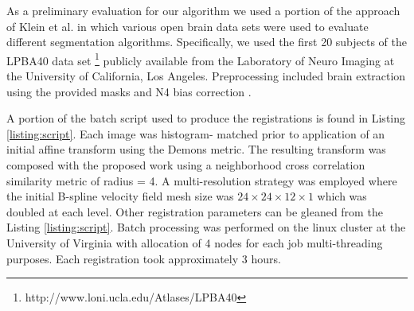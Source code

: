 \documentclass{llncs}
\begin{document}
As a preliminary evaluation for our algorithm we used a portion 
of the approach of Klein et al. \cite{Klein2009} in which 
various open brain data sets were used to evaluate different
segmentation algorithms.  Specifically, we used the first 20 
subjects of the LPBA40 data
set \cite{shattuck2008}%
\footnote{
http://www.loni.ucla.edu/Atlases/LPBA40
}
publicly available from the Laboratory of Neuro Imaging at
the University of California, Los Angeles.  Preprocessing included
brain extraction using the provided masks and N4 bias correction
\cite{tustison2010}.  


A portion of the batch script used to produce the registrations is 
found in Listing \ref{listing:script}.  Each image was histogram-
matched prior to application of an initial affine transform using
the Demons metric.  The resulting transform was composed with the
proposed work using a neighborhood cross correlation similarity metric
\cite{avants2008} of radius = 4.  A multi-resolution strategy was 
employed where the initial B-spline velocity field mesh size was 
$24\times24\times12\times1$ which was doubled at each level.  
Other registration parameters can be gleaned from the Listing \ref{listing:script}.
Batch processing was performed on the linux cluster at the 
University of Virginia with allocation of 4 nodes for each job
multi-threading purposes.  Each registration took approximately
3 hours.
\end{document}
